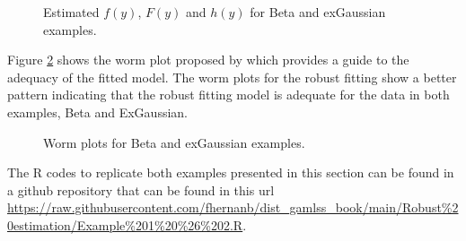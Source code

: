 \documentclass{article}
\begin{document}
\begin{figure}[htp]
\centering
{}
\caption{\label{3plots_both_examples} Estimated $f(y)$, $F(y)$ and $h(y)$ for Beta and exGaussian examples.}
\end{figure}

Figure \ref{wp_both_examples} shows the worm plot proposed by \cite{buuren2001worm} which provides a guide to the adequacy of the fitted model. The worm plots for the robust fitting show a better pattern indicating that the robust fitting model is adequate for the data in both examples, Beta and ExGaussian.

\begin{figure}[htp]
\centering
{}
\caption{\label{wp_both_examples} Worm plots for Beta and exGaussian examples.}
\end{figure}

The R codes to replicate both examples presented in this section can be found in a github repository that can be found in this url \url{https://raw.githubusercontent.com/fhernanb/dist_gamlss_book/main/Robust%20estimation/Example%201%20%26%202.R}.
    

\end{document}

